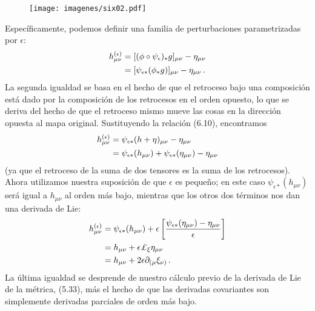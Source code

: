 \documentclass[11pt,b5paper,openany,twoside]{book}
\newcommand{\mn}{{\mu\nu}}
\def\lie{\pounds}
\begin{document}
\begin{figure}[h]
\centering
\texttt{[image: imagenes/six02.pdf]}
\end{figure}

\noindent
Específicamente, podemos definir una familia de perturbaciones parametrizadas por $\epsilon$:
\begin{align}
h_\mn^{(\epsilon)}  &=  [(\phi\circ\psi_\epsilon)_*g]_\mn
- \eta_\mn \notag \\
&=  [\psi_{\epsilon *}(\phi_*g)]_\mn - \eta_\mn\,. \label{6.11}
\end{align}
La segunda igualdad se basa en el hecho de que el retroceso bajo una composición está dado por la composición de los retrocesos en el orden opuesto, lo que se deriva del hecho de que el retroceso mismo mueve las cosas en la dirección opuesta al mapa original.
Sustituyendo la relación (6.10), encontramos
\begin{align}
h_\mn^{(\epsilon)}  &=  \psi_{\epsilon *}(h +\eta)_\mn
-\eta_\mn  \notag \\
&=  \psi_{\epsilon *}(h_\mn) +\psi_{\epsilon *}(\eta_\mn)-\eta_\mn
\label{6.12}
\end{align}
(ya que el retroceso de la suma de dos tensores es la suma de los retrocesos).
Ahora utilizamos nuestra suposición de que $\epsilon$ es pequeño; en este caso $\psi_{\epsilon *}(h_\mn)$ será igual a $h_\mn$ al orden más bajo, mientras que los otros dos términos nos dan una derivada de Lie:
\begin{align}
h_\mn^{(\epsilon)}  &=  \psi_{\epsilon *}(h_\mn)
+\epsilon\left[{{\psi_{\epsilon *}(\eta_\mn)-\eta_\mn}\over
\epsilon}\right]  \notag \\
&=  h_\mn + \epsilon \lie_\xi\eta_\mn  \notag \\
&=  h_\mn + 2\epsilon\partial_{(\mu}\xi_{\nu)}\,. \label{6.13}
\end{align}
La última igualdad se desprende de nuestro cálculo previo de la derivada de Lie de la métrica, (5.33), más el hecho de que las derivadas covariantes son simplemente derivadas parciales de orden más bajo.
\end{document}
